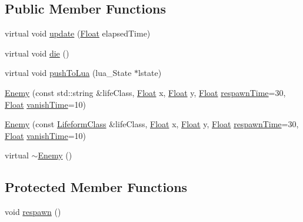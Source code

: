 \subsection*{Public Member Functions}
\begin{DoxyCompactItemize}
\item 
virtual void \hyperlink{classZeta_1_1Enemy_aaaf552df4ff3f920662496f8abbe46e7}{update} (\hyperlink{namespaceZeta_a1e0a1265f9b3bd3075fb0fabd39088ba}{Float} elapsed\+Time)
\item 
virtual void \hyperlink{classZeta_1_1Enemy_a9592e2e4b7663b98aa3a1352bad28342}{die} ()
\item 
virtual void \hyperlink{classZeta_1_1Enemy_add1a2316358c32695376bed8f29f4f88}{push\+To\+Lua} (lua\+\_\+\+State $\ast$lstate)
\item 
\hyperlink{classZeta_1_1Enemy_ab4ad41632788da06d1b78b4af9ae0959}{Enemy} (const std\+::string \&life\+Class, \hyperlink{namespaceZeta_a1e0a1265f9b3bd3075fb0fabd39088ba}{Float} x, \hyperlink{namespaceZeta_a1e0a1265f9b3bd3075fb0fabd39088ba}{Float} y, \hyperlink{namespaceZeta_a1e0a1265f9b3bd3075fb0fabd39088ba}{Float} \hyperlink{classZeta_1_1Enemy_ad36f629c50a6aa803d35c91d1614a08a}{respawn\+Time}=30, \hyperlink{namespaceZeta_a1e0a1265f9b3bd3075fb0fabd39088ba}{Float} \hyperlink{classZeta_1_1Enemy_ada5f42b351b3ba7fbb72ca3b87dcc7f3}{vanish\+Time}=10)
\item 
\hyperlink{classZeta_1_1Enemy_a9de67318d4f91caffbcc0d08997ae081}{Enemy} (const \hyperlink{classZeta_1_1LifeformClass}{Lifeform\+Class} \&life\+Class, \hyperlink{namespaceZeta_a1e0a1265f9b3bd3075fb0fabd39088ba}{Float} x, \hyperlink{namespaceZeta_a1e0a1265f9b3bd3075fb0fabd39088ba}{Float} y, \hyperlink{namespaceZeta_a1e0a1265f9b3bd3075fb0fabd39088ba}{Float} \hyperlink{classZeta_1_1Enemy_ad36f629c50a6aa803d35c91d1614a08a}{respawn\+Time}=30, \hyperlink{namespaceZeta_a1e0a1265f9b3bd3075fb0fabd39088ba}{Float} \hyperlink{classZeta_1_1Enemy_ada5f42b351b3ba7fbb72ca3b87dcc7f3}{vanish\+Time}=10)
\item 
virtual \hyperlink{classZeta_1_1Enemy_aeaa15ca818aae74e132565576bd16b30}{$\sim$\+Enemy} ()
\end{DoxyCompactItemize}
\subsection*{Protected Member Functions}
\begin{DoxyCompactItemize}
\item 
void \hyperlink{classZeta_1_1Enemy_a3e2e3b7ded67b08f5df6d422f2572579}{respawn} ()
\end{DoxyCompactItemize}
